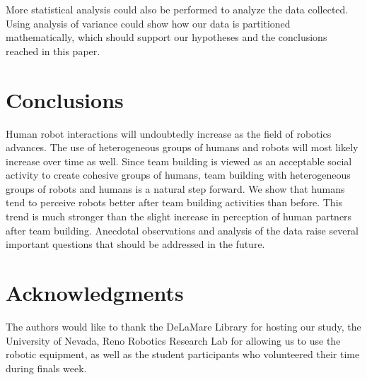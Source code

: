\documentclass{acm_proc_article-sp}
\begin{document}
More statistical analysis could also be performed to analyze the data collected. Using analysis of variance could show how our data is partitioned mathematically, which should support our hypotheses and the conclusions reached in this paper.

\section{Conclusions}
\label{section:conclusions}
Human robot interactions will undoubtedly increase as the field of robotics advances. The use of heterogeneous groups of humans and robots will most likely increase over time as well. Since team building is viewed as an acceptable social activity to create cohesive groups of humans, team building with heterogeneous groups of robots and humans is a natural step forward. We show that humans tend to perceive robots better after team building activities than before. This trend is much stronger than the slight increase in perception of human partners after team building. Anecdotal observations and analysis of the data raise several important questions that should be addressed in the future. 


\section{Acknowledgments}
\label{section:}
The authors would like to thank the DeLaMare Library for hosting our study, the University of Nevada, Reno Robotics Research Lab for allowing us to use the robotic equipment, as well as the student participants who volunteered their time during finals week.

%

\end{document}
